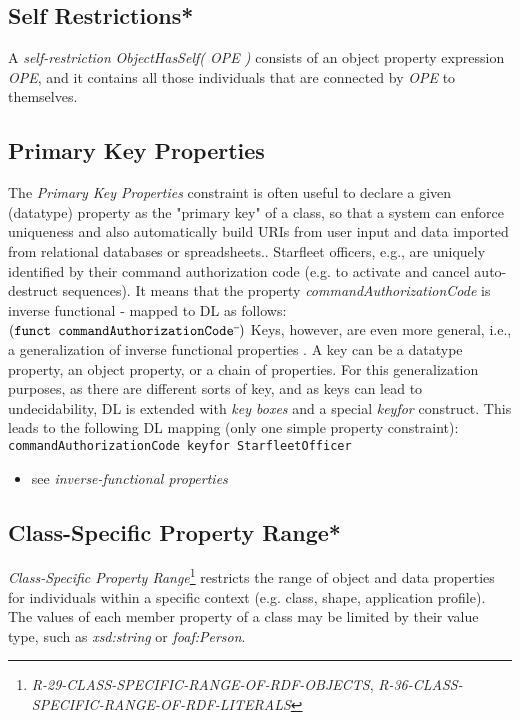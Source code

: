 \documentclass{llncs}
\newcommand{\ms}[1]{\texttt{#1}}
\begin{document}
\subsection{Self Restrictions*}

A \emph{self-restriction} \emph{ObjectHasSelf( OPE )} consists of an object property expression \emph{OPE}, and it contains all those individuals that are connected by \emph{OPE} to themselves. 

\subsection{Primary Key Properties}

The \emph{Primary Key Properties} constraint is often useful to declare a given (datatype) property as the "primary key" of a class, so that a system can enforce uniqueness and also automatically build URIs from user input and data imported from relational databases or spreadsheets.. 
Starfleet officers, e.g., are uniquely identified by their command authorization code (e.g. to activate and cancel auto-destruct sequences).
It means that the property \emph{commandAuthorizationCode} is inverse functional - mapped to DL as follows:
$(\ms{funct commandAuthorizationCode}\sp{\overline{\ }})$
Keys, however, are even more general, i.e., a generalization of inverse functional properties \cite{Schneider2009}.
A key can be a datatype property, an object property, or a chain of properties.
For this generalization purposes, as there are different sorts of key, and as keys can lead to undecidability, 
DL is extended with \emph{key boxes} and a special \emph{keyfor} construct\cite{Lutz2005}.
This leads to the following DL mapping (only one simple property constraint):
\ms{commandAuthorizationCode \ms{keyfor} StarfleetOfficer}

\begin{itemize}
	\item see \emph{inverse-functional properties}
\end{itemize}

\subsection{Class-Specific Property Range*}		

{\em Class-Specific Property Range}\footnote{{\em R-29-CLASS-SPECIFIC-RANGE-OF-RDF-OBJECTS}, {\em R-36-CLASS-SPECIFIC-RANGE-OF-RDF-LITERALS}} restricts the range of object and data properties for individuals within a specific context (e.g. class, shape, application profile).
The values of each member property of a class may be limited by their value type, such as \emph{xsd:string} or \emph{foaf:Person}. 
\end{document}
